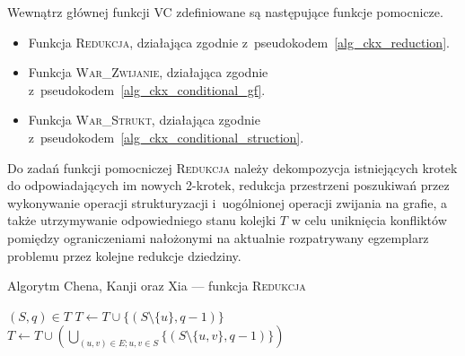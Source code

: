 {  Wewnątrz głównej funkcji \textsc{VC} zdefiniowane są następujące funkcje pomocnicze.
  \begin{itemize}
    \item Funkcja \textsc{Redukcja}, działająca zgodnie z~pseudokodem~\ref{alg_ckx_reduction}.
    \item Funkcja \textsc{War\_Zwijanie}, działająca zgodnie z~pseudokodem~\ref{alg_ckx_conditional_gf}.
    \item Funkcja \textsc{War\_Strukt}, działająca zgodnie z~pseudokodem~\ref{alg_ckx_conditional_struction}.
  \end{itemize}

  Do zadań funkcji pomocniczej \textsc{Redukcja} należy dekompozycja istniejących krotek do odpowiadających im nowych 2-krotek, redukcja przestrzeni poszukiwań przez wykonywanie operacji strukturyzacji i~uogólnionej operacji zwijania na grafie, a także utrzymywanie odpowiedniego stanu kolejki $T$ w celu uniknięcia konfliktów pomiędzy ograniczeniami nałożonymi na aktualnie rozpatrywany egzemplarz problemu przez kolejne redukcje dziedziny.

  \begin{algorithm}
   \caption{Algorytm Chena, Kanji oraz Xia --- funkcja \textsc{Redukcja}}\label{alg_ckx_reduction}
   \begin{algorithmic}[1]
      \ForAll$(S, q) \in T$
        \EndIf
          \State$T \gets T \cup \{(S \setminus \{u\}, q-1)\}$\label{a2}
        \EndFor
          \State$T \gets T \cup (\bigcup_{(u, v) \in E; u,v \in S}\{(S \setminus \{u, v\}, q-1)\})$\label{a3}
        \EndIf
        \label{a4}
        \EndIf
      \EndFor
      \label{b}
        \State{}
      \EndIf
      \EndIf
    \EndFunction
   \end{algorithmic}
  \end{algorithm}

}
